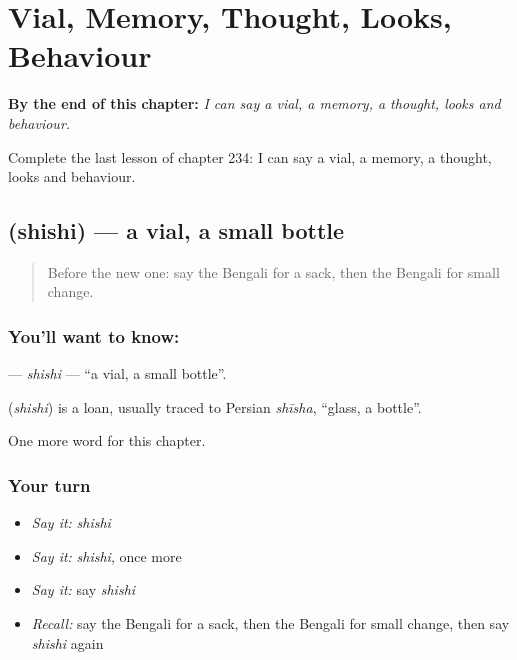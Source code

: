 
\chapter{Vial, Memory, Thought, Looks, Behaviour}
\label{ch:bn-vial-memory-thought-looks-behaviour}

\begin{chapteropening}
\textbf{By the end of this chapter:} \emph{I can say a vial, a memory, a thought, looks and behaviour.}

Complete the last lesson of chapter 234: I can say a vial, a memory, a thought, looks and behaviour.
\end{chapteropening}

\section[\texorpdfstring{\bn{শিশি} (shishi)}{শিশি (shishi)}]{ (shishi) — a vial, a small bottle}

\label{lesson:BN-C234-shishi}



\begin{quote}
Before the new one: say the Bengali for a sack, then the Bengali for small change.
\end{quote}

\subsection*{You'll want to know: }
\textbf{} — \emph{shishi} — \textquotedblleft{}a vial, a small bottle\textquotedblright{}.

\begin{cousinweb}
\textbf{} (\emph{shishi}) is a loan, usually traced to Persian \emph{shīsha}, \textquotedblleft{}glass, a bottle\textquotedblright{}.
\end{cousinweb}

\begin{grammarlens}[title={What you've built}]
One more word for this chapter.
\end{grammarlens}

\subsection*{Your turn}
\begin{itemize}
\raggedright
  \item \emph{Say it:} \emph{shishi}
  \item \emph{Say it:} \emph{shishi}, once more
  \item \emph{Say it:} say \emph{shishi}
  \item \emph{Recall:} say the Bengali for a sack, then the Bengali for small change, then say \emph{shishi} again
\end{itemize}

